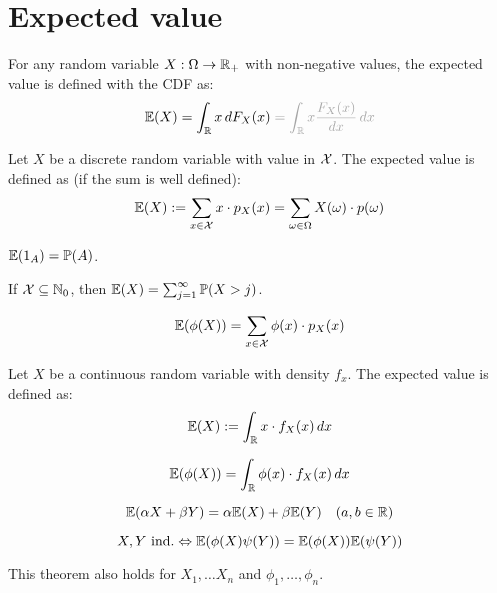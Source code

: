 \section{Expected value}

For any random variable \(X: \Omega \to \mathbb{R}_+\) with non-negative values, the expected value is defined with the CDF as:
\[\E(X) = \int_\R x \,dF_X(x) \color{gray!70} = \int_\R x \frac{F_X(x)}{dx} \, dx\]

\begin{ddefinition*}
  Let \(X\) be a discrete random variable with value in \(\operatorname{\mathcal{X}}\). The expected value is defined as (if the sum is well defined):
  \[\mathbb{E}(X) := \sum_{x \in \operatorname{\mathcal{X}}}x \cdot p_X(x) = \sum_{\omega \in \Omega} X(\omega) \cdot p(\omega)\]
\end{ddefinition*}

\begin{proposition}
  {\small \(\mathbb{E}(1_A) = \mathbb{P}(A)\)}.
\end{proposition}

\begin{proposition}
  If \(\operatorname{\mathcal{X}} \subseteq \mathbb{N}_0\), then \(\mathbb{E}(X) = \sum_{j=1}^\infty \mathbb{P}(X > j)\).
\end{proposition}

\begin{dtheorem*} \vspace{-5pt}
  \[\mathbb{E}(\phi(X)) = \sum_{x \in \operatorname{\mathcal{X}}}\phi(x) \cdot p_X(x)\]
\end{dtheorem*}

\begin{cdefinition*}
  Let \(X\) be a continuous random variable with density \(f_x\). The expected value is defined as:
  \[\mathbb{E}(X) := \int_{\mathbb{R}} x \cdot f_X(x) \,dx\]
\end{cdefinition*}

\begin{ctheorem*} \vspace{-5pt}
  \[\mathbb{E}(\phi(X)) = \int_{\mathbb{R}} \phi(x) \cdot f_X(x) \, dx\]
\end{ctheorem*}

\begin{theorem*} \vspace{-5pt}
  \[\mathbb{E}(\alpha X + \beta Y) = \alpha \mathbb{E}(X) + \beta \mathbb{E}(Y) \quad (a, b \in \mathbb{R})\]
\end{theorem*}

\begin{theorem*} \vspace{-5pt}
  \[X, Y \ \text{ind.} \Leftrightarrow \mathbb{E}(\phi(X) \psi(Y)) = \mathbb{E}(\phi(X)) \mathbb{E}(\psi(Y))\]
\end{theorem*}
This theorem also holds for \(X_1, \ldots X_n\) and \(\phi_1, \ldots, \phi_n\).

